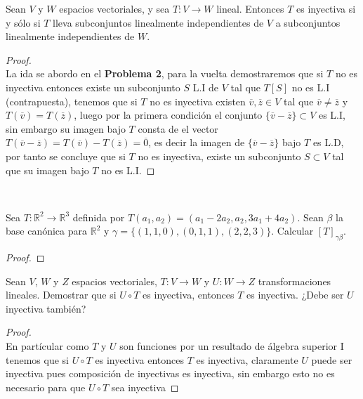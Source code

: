 \documentclass[11pt]{article}
\numberwithin{equation}{section}
\newcommand{\R}{\mathbb{R}}
\begin{document}
\begin{Problema}{} Sean $V$ y $W$ espacios vectoriales, y sea $T: V \to W$ lineal. 
    Entonces $T$ es inyectiva si y sólo si $T$ lleva subconjuntos linealmente 
    independientes de $V$ a subconjuntos linealmente independientes de $W$.
\end{Problema}      
\begin{proof}\,\\
    La ida se abordo en el \textbf{Problema 2}, para la vuelta demostraremos que si $T$ no es inyectiva
    entonces existe un subconjunto $S$ L.I de $V$ tal que $T[S]$ no es L.I (contrapuesta), tenemos que si $T$ no es inyectiva
    existen $\overline{v},\overline{z}\in V$ tal que $\overline{v}\neq \overline{z}$ y $T(\overline{v})=T(\overline{z})$, luego
    por la primera condici\'on el conjunto $\{\overline{v}-\overline{z}\}\subset V$ es L.I, sin embargo  su imagen bajo $T$ consta 
    de el vector $T(\overline{v}-\overline{z})=T(\overline{v})-T(\overline{z})=\overline{0}$, es decir la imagen de $\{\overline{v}-\overline{z}\}$
    bajo $T$ es L.D, por tanto se concluye que si $T$ no es inyectiva, existe un subconjunto $S\subset V$ tal que su imagen bajo $T$
    no es L.I.
\end{proof}\,\\


\begin{Problema}{} Sea $T: \R^2 \to \R^3$ definida por $T(a_1, a_2) = (a_1 - 2a_2, a_2, 3a_1 + 4a_2)$. 
    Sean $\beta$ la base canónica para $\R^2$ y $\gamma = \{(1,1,0), (0,1,1), (2,2,3)\}$. Calcular $[T]_{\gamma \beta}$.
\end{Problema}
\begin{proof}
    
\end{proof}


\begin{Problema}{} Sean $V$, $W$ y $Z$ espacios vectoriales, $T: V \to W$ y $U: W \to Z$ transformaciones lineales. 
    Demostrar que si $U \circ T$ es inyectiva, entonces $T$ es inyectiva. ¿Debe ser $U$ inyectiva también?
\end{Problema}
\begin{proof}\,\\
    En part\'icular como $T$ y $U$ son funciones por un resultado de \'algebra superior I tenemos que 
    si $U\circ T$ es inyectiva entonces $T$ es inyectiva, claramente $U$ puede ser inyectiva
    pues composici\'on de inyectivas es inyectiva, sin embargo esto no es necesario para que $U\circ T$ sea inyectiva
\end{proof}\,\\
\end{document}
